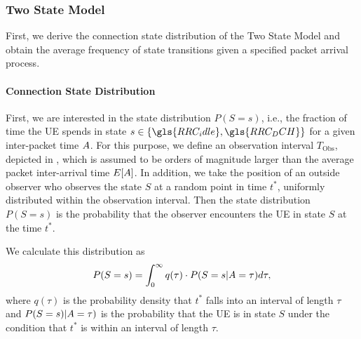 \subsubsection*{Two State Model}\label{sec:network:performance_model:analytical_model:two_states}

\newcommand{\RRCState}{S\xspace}
\newcommand{\PacketIATDensity}{a\xspace}
\newcommand{\RRCStateRealization}{s\xspace}
\newcommand{\ObservationInterval}{T_{\text{Obs}}\xspace}
\newcommand{\ObservationPoint}{t^*\xspace}
\newcommand{\ObservationIntervalDensity}{q\xspace}
\newcommand{\ObservationIntervalLength}{\tau\xspace}
\newcommand{\NormalisationConstant}{c_0\xspace}
\newcommand{\NObservedPackets}{n_{\text{P}}\xspace}

First, we derive the connection state distribution of the Two State Model and obtain the average frequency of state transitions given a specified packet arrival process.

\paragraph*{Connection State Distribution}
First, we are interested in the state distribution \(P(\RRCState=\RRCStateRealization)\), i.e., the fraction of time the \gls{UE} spends in state \(\RRCStateRealization\in\{\gls{RRC_idle},\gls{RRC_DCH}\}\) for a given inter-packet time \(A\).
For this purpose, we define an observation interval \(\ObservationInterval\), depicted in , which is assumed to be orders of magnitude larger than the average packet inter-arrival time \(E[A]\).
In addition, we take the position of an outside observer who observes the state \(\RRCState\) at a random point in time \(\ObservationPoint\), uniformly distributed within the observation interval.
Then the state distribution \(P(\RRCState=\RRCStateRealization)\) is the probability that the observer encounters the \gls{UE} in state \(\RRCState\) at the time \(\ObservationPoint\).

We calculate this distribution as
\begin{equation}
P(\RRCState=\RRCStateRealization)=
  \int_{0}^\infty \ObservationIntervalDensity(\tau) \cdot
  P(\RRCState=\RRCStateRealization \vert \PacketIAT = \ObservationIntervalLength) d\ObservationIntervalLength,
  \label{eq:network:performance_model:system_description:state_distribution}
\end{equation}
where \(\ObservationIntervalDensity(\ObservationIntervalLength)\) is the probability density that \(\ObservationPoint\) falls into an interval of length \(\ObservationIntervalLength\) and
\(P(\RRCState=\RRCStateRealization) \vert \PacketIAT = \ObservationIntervalLength)\)
is the probability that the \gls{UE} is in state \(\RRCState\) under the condition that \(\ObservationPoint\) is within an interval of length \(\ObservationIntervalLength\).

